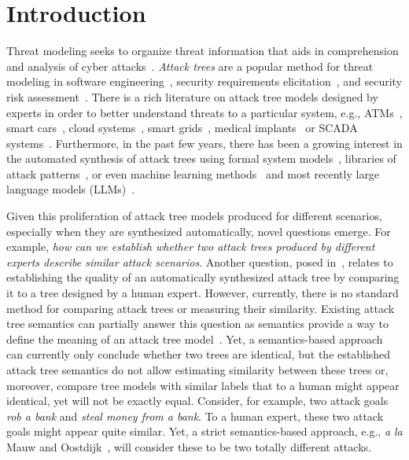 

\section{Introduction}
\label{sec:introduction}

Threat modeling seeks to organize threat information that aids in comprehension and analysis of cyber attacks~\cite{andersonSecurityEngineeringGuide2020,schneierSecretsLiesDigital2000}. \emph{Attack trees} are a popular method for threat modeling in software engineering~\cite{shostack2014threat,tarandach2020threat}, security requirements elicitation~\cite{rashid2016discovering,mai2018modeling}, and security risk assessment~\cite{ingoldsby2010attack,paul2014unifying}. There is a rich literature on attack tree models designed by experts in order to better understand threats to a particular system, e.g., ATMs~\cite{fraile2016using}, smart cars~\cite{kong2018security,ren2011novel}, cloud systems~\cite{wang2012threat,duncan2019combined}, smart grids~\cite{beckers2014determining,mclaughlin2010energy}, medical implants~\cite{siddiqi2018attack} or SCADA systems~\cite{ten2007vulnerability}. Furthermore, in the past few years, there has been a growing interest in the automated synthesis of attack trees using formal system models~\cite{widel2019beyond,ivanova2015attack,vigo2014automated,pinchinat2015atsyra,gadyatskayaRefinementAwareGenerationAttack2017}, libraries of attack patterns~\cite{jhawar2018semi,bryans2020template}, or even machine learning methods~\cite{sowka2021towards} and most recently large language models (LLMs)~\cite{gadyatskaya2023chatgpt}.

Given this proliferation of attack tree models produced for different scenarios, especially when they are synthesized automatically, novel questions emerge. For example, \emph{how can we establish whether two attack trees produced by different experts describe similar attack scenarios}.
Another question, posed in~\cite{gadyatskaya2023chatgpt}, relates to establishing the quality of an automatically synthesized attack tree by comparing it to a tree designed by a human expert. However, currently, there is no standard method for comparing attack trees or measuring their similarity. Existing attack tree semantics can partially answer this question as semantics provide a way to define the meaning of an attack tree model~\cite{mauwFoundationsAttackTrees2006}. Yet, a semantics-based approach can currently only conclude whether two trees are identical, but the established attack tree semantics do not allow estimating similarity between these trees or, moreover, compare tree models with similar labels that to a human might appear identical, yet will not be exactly equal. Consider, for example, two attack goals \emph{rob a bank} and \emph{steal money from a bank}. To a human expert, these two attack goals might appear quite similar. Yet, a strict semantics-based approach, e.g., \emph{a la} Mauw and Oostdijk~\cite{mauwFoundationsAttackTrees2006}, will consider these to be two totally different attacks.  %

